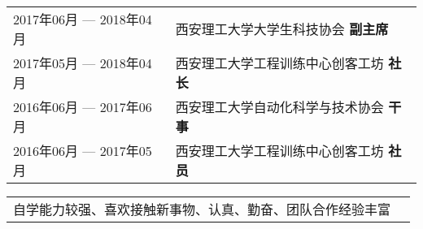 \documentclass[zh]{resume}
\begin{document}
\begin{table}[!htbp]
    \begin{tabular}{ll}
        2017年06月 --- 2018年04月 & 西安理工大学大学生科技协会 \textbf{副主席}     \\
        2017年05月 --- 2018年04月 & 西安理工大学工程训练中心创客工坊 \textbf{社长} \\
        2016年06月 --- 2017年06月 & 西安理工大学自动化科学与技术协会 \textbf{干事} \\
        2016年06月 --- 2017年05月 & 西安理工大学工程训练中心创客工坊 \textbf{社员} \\
    \end{tabular}
\end{table}

\begin{table}[!htbp]
    \begin{tabular}{rl}
        自学能力较强、喜欢接触新事物、认真、勤奋、团队合作经验丰富
    \end{tabular}
\end{table}
\end{document}
